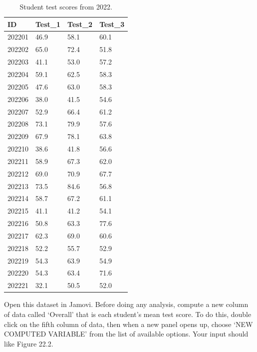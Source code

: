 \documentclass[
]{scrbook}
\begin{document}
\begin{table}

\caption{\label{tab:unnamed-chunk-99}Student test scores from 2022.}
\centering
\begin{tabular}[t]{l|l|l|l}
\hline
ID & Test\_1 & Test\_2 & Test\_3\\
\hline
202201 & 46.9 & 58.1 & 60.1\\
\hline
202202 & 65.0 & 72.4 & 51.8\\
\hline
202203 & 41.1 & 53.0 & 57.2\\
\hline
202204 & 59.1 & 62.5 & 58.3\\
\hline
202205 & 47.6 & 63.0 & 58.3\\
\hline
202206 & 38.0 & 41.5 & 54.6\\
\hline
202207 & 52.9 & 66.4 & 61.2\\
\hline
202208 & 73.1 & 79.9 & 57.6\\
\hline
202209 & 67.9 & 78.1 & 63.8\\
\hline
202210 & 38.6 & 41.8 & 56.6\\
\hline
202211 & 58.9 & 67.3 & 62.0\\
\hline
202212 & 69.0 & 70.9 & 67.7\\
\hline
202213 & 73.5 & 84.6 & 56.8\\
\hline
202214 & 58.7 & 67.2 & 61.1\\
\hline
202215 & 41.1 & 41.2 & 54.1\\
\hline
202216 & 50.8 & 63.3 & 77.6\\
\hline
202217 & 62.3 & 69.0 & 60.6\\
\hline
202218 & 52.2 & 55.7 & 52.9\\
\hline
202219 & 54.3 & 63.9 & 54.9\\
\hline
202220 & 54.3 & 63.4 & 71.6\\
\hline
202221 & 32.1 & 50.5 & 52.0\\
\hline
\end{tabular}
\end{table}

Open this dataset in Jamovi.
Before doing any analysis, compute a new column of data called `Overall' that is each student's mean test score.
To do this, double click on the fifth column of data, then when a new panel opens up, choose `NEW COMPUTED VARIABLE' from the list of available options.
Your input should like Figure 22.2.
\end{document}
